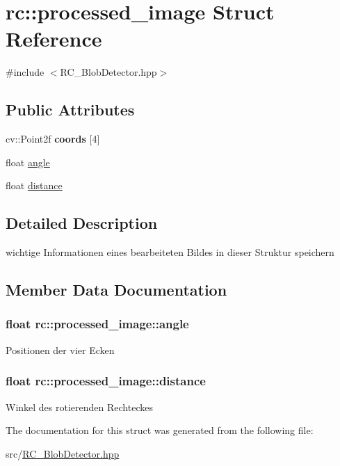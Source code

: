\hypertarget{structrc_1_1processed__image}{\section{rc\+:\+:processed\+\_\+image Struct Reference}
\label{structrc_1_1processed__image}
}


{\ttfamily \#include $<$R\+C\+\_\+\+Blob\+Detector.\+hpp$>$}

\subsection*{Public Attributes}
\begin{DoxyCompactItemize}
\item 
\hypertarget{structrc_1_1processed__image_a7d6fc72e5cd65da3b18b3b0cb18e9b42}{cv\+::\+Point2f {\bfseries coords} \mbox{[}4\mbox{]}}\label{structrc_1_1processed__image_a7d6fc72e5cd65da3b18b3b0cb18e9b42}

\item 
float \hyperlink{structrc_1_1processed__image_ac17fea85630583e2cf1de55b89334e4f}{angle}
\item 
float \hyperlink{structrc_1_1processed__image_a6f90b2318450001568fcc112e294f8df}{distance}
\end{DoxyCompactItemize}


\subsection{Detailed Description}
wichtige Informationen eines bearbeiteten Bildes in dieser Struktur speichern 

\subsection{Member Data Documentation}
\hypertarget{structrc_1_1processed__image_ac17fea85630583e2cf1de55b89334e4f}{
\subsubsection[{angle}]{\setlength{\rightskip}{0pt plus 5cm}float rc\+::processed\+\_\+image\+::angle}}\label{structrc_1_1processed__image_ac17fea85630583e2cf1de55b89334e4f}
Positionen der vier Ecken \hypertarget{structrc_1_1processed__image_a6f90b2318450001568fcc112e294f8df}{
\subsubsection[{distance}]{\setlength{\rightskip}{0pt plus 5cm}float rc\+::processed\+\_\+image\+::distance}}\label{structrc_1_1processed__image_a6f90b2318450001568fcc112e294f8df}
Winkel des rotierenden Rechteckes 

The documentation for this struct was generated from the following file\+:\begin{DoxyCompactItemize}
\item 
src/\hyperlink{RC__BlobDetector_8hpp}{R\+C\+\_\+\+Blob\+Detector.\+hpp}\end{DoxyCompactItemize}
